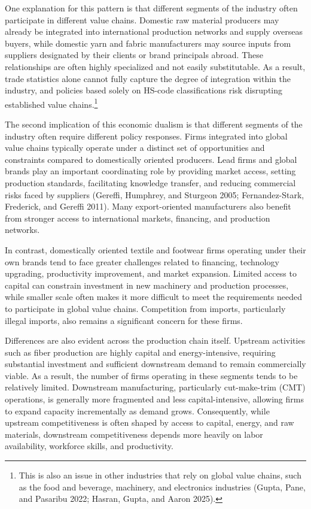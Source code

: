 \documentclass[
  manuscript=article,
  layout=publish,
  year=2026,
  volume=1,
]{den}
\begin{document}
One explanation for this pattern is that different segments of the
industry often participate in different value chains. Domestic raw
material producers may already be integrated into international
production networks and supply overseas buyers, while domestic yarn and
fabric manufacturers may source inputs from suppliers designated by
their clients or brand principals abroad. These relationships are often
highly specialized and not easily substitutable. As a result, trade
statistics alone cannot fully capture the degree of integration within
the industry, and policies based solely on HS-code classifications risk
disrupting established value chains.\footnote{This is also an issue in
  other industries that rely on global value chains, such as the food
  and beverage, machinery, and electronics industries (Gupta, Pane, and
  Pasaribu 2022; Hasran, Gupta, and Aaron 2025).}

The second implication of this economic dualism is that different
segments of the industry often require different policy responses. Firms
integrated into global value chains typically operate under a distinct
set of opportunities and constraints compared to domestically oriented
producers. Lead firms and global brands play an important coordinating
role by providing market access, setting production standards,
facilitating knowledge transfer, and reducing commercial risks faced by
suppliers (Gereffi, Humphrey, and Sturgeon 2005; Fernandez-Stark,
Frederick, and Gereffi 2011). Many export-oriented manufacturers also
benefit from stronger access to international markets, financing, and
production networks.

In contrast, domestically oriented textile and footwear firms operating
under their own brands tend to face greater challenges related to
financing, technology upgrading, productivity improvement, and market
expansion. Limited access to capital can constrain investment in new
machinery and production processes, while smaller scale often makes it
more difficult to meet the requirements needed to participate in global
value chains. Competition from imports, particularly illegal imports,
also remains a significant concern for these firms.

Differences are also evident across the production chain itself.
Upstream activities such as fiber production are highly capital and
energy-intensive, requiring substantial investment and sufficient
downstream demand to remain commercially viable. As a result, the number
of firms operating in these segments tends to be relatively limited.
Downstream manufacturing, particularly cut-make-trim (CMT) operations,
is generally more fragmented and less capital-intensive, allowing firms
to expand capacity incrementally as demand grows. Consequently, while
upstream competitiveness is often shaped by access to capital, energy,
and raw materials, downstream competitiveness depends more heavily on
labor availability, workforce skills, and productivity.
\end{document}
